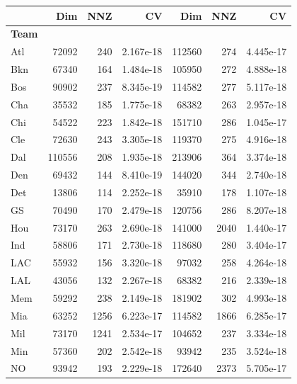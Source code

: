 \documentclass[review,letterpaper,11pt]{elsarticle}
\begin{document}
\begin{table}[tbh]
\centering
\begin{tabular}{lrrr|rrr}
\toprule
{} &  \textbf{Dim} & \textbf{NNZ} & \textbf{CV}  & \textbf{Dim} & \textbf{NNZ} & \textbf{CV} \\
\midrule
\textbf{Team} & &            &            &        &            &           \\
Atl  &    72092 &        240 &  2.167e-18 & 112560 &        274 &  4.445e-17 \\
Bkn  &    67340 &        164 &  1.484e-18 & 105950 &        272 &  4.888e-18 \\
Bos  &    90902 &        237 &  8.345e-19 & 114582 &        277 &  5.117e-18 \\
Cha  &    35532 &        185 &  1.775e-18 & 68382 &        263 &  2.957e-18 \\
Chi  &    54522 &        223 &  1.842e-18 & 151710 &        286 &  1.045e-17 \\
Cle  &    72630 &        243 &  3.305e-18 & 119370 &        275 &  4.916e-18 \\
Dal  &   110556 &        208 &  1.935e-18 & 213906 &        364 &  3.374e-18 \\
Den  &    69432 &        144 &  8.410e-19 & 144020 &        344 &  2.740e-18 \\
Det  &    13806 &        114 &  2.252e-18 & 35910 &        178 &  1.107e-18 \\
GS   &    70490 &        170 &  2.479e-18 & 120756 &        286 &  8.207e-18 \\
Hou  &    73170 &        263 &  2.690e-18 & 141000 &       2040 &  1.440e-17 \\
Ind  &    58806 &        171 &  2.730e-18 & 118680 &        280 &  3.404e-17 \\
LAC  &    55932 &        156 &  3.320e-18 & 97032 &        258 &  4.264e-18 \\
LAL  &    43056 &        132 &  2.267e-18 & 68382 &        216 &  2.339e-18 \\
Mem  &    59292 &        238 &  2.149e-18 & 181902 &        302 &  4.993e-18 \\
Mia  &    63252 &       1256 &  6.223e-17 & 114582 &       1866 &  6.285e-17 \\
Mil  &    73170 &       1241 &  2.534e-17 & 104652 &        237 &  3.334e-18 \\
Min  &    57360 &        202 &  2.542e-18 & 93942 &        235 &  3.524e-18 \\
NO   &    93942 &        193 &  2.229e-18 & 172640 &       2373 &  5.705e-17 \\

\end{tabular}
\end{table}
\end{document}
